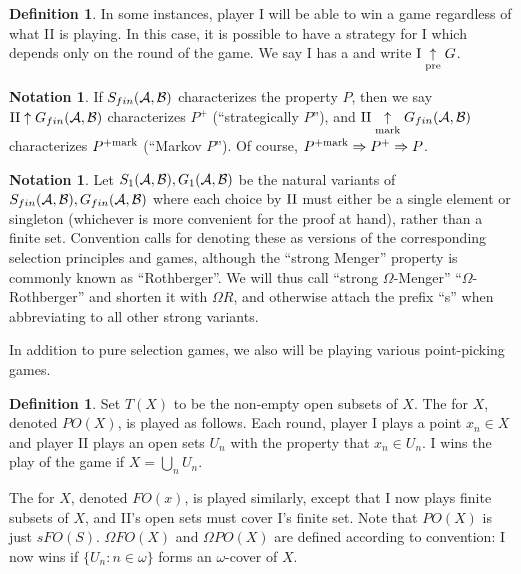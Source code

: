 \documentclass[11pt]{article}
\theoremstyle{plain}
\theoremstyle{definition}
\newtheorem{definition}[theorem]{Definition}
\newtheorem{notation}[theorem]{Notation}
\theoremstyle{remark}
\theoremstyle{plain}
\theoremstyle{definition}
\theoremstyle{remark}
\begin{document}
\begin{definition}
In some instances, player I will be able to win a game regardless of what II is playing.
In this case, it is possible to have a strategy for I which depends only on the round of the game.
We say I has a  and write \(\mathrm{I}\underset{\text{pre}}{\uparrow} G\).
\end{definition}

\begin{notation}
  If \(S_{fin}(\mathcal{A},\mathcal{B})\) characterizes the property \(P\),
  then we say \(\mathrm{II}\uparrow G_{fin}(\mathcal{A},\mathcal{B})\) characterizes
  \(P^+\) (``strategically \(P\)''), and
  \(\mathrm{II}\underset{\text{mark}}{\uparrow}G_{fin}(\mathcal{A},\mathcal{B})\) characterizes
  \(P^{+\mathrm{mark}}\) (``Markov \(P\)'').
  Of course, \(P^{+\mathrm{mark}}\Rightarrow P^+ \Rightarrow P\).
\end{notation}

\begin{notation}
Let \(S_{1}(\mathcal{A},\mathcal{B}),G_{1}(\mathcal{A},\mathcal{B})\)
be the natural variants of
\(S_{fin}(\mathcal{A},\mathcal{B}),G_{fin}(\mathcal{A},\mathcal{B})\) where each choice
by \(\mathrm{II}\) must either be a single element or singleton
(whichever is more convenient for the proof at hand), rather than a finite
set. Convention calls for denoting these as
 versions of the corresponding selection principles and games,
although the ``strong Menger'' property is commonly known as ``Rothberger''. We will thus
call ``strong \(\Omega\)-Menger'' ``\(\Omega\)-Rothberger'' and shorten it
with \(\Omega R\), and otherwise attach the prefix ``s''
when abbreviating to all other strong variants.
\end{notation}

In addition to pure selection games, we also will be playing various point-picking games.

\begin{definition}
Set \(T(X)\) to be the non-empty open subsets of \(X\).
The  for \(X\), denoted \(PO(X)\), is played as follows.
Each round, player I plays a point \(x_n \in X\) and player II plays an open sets \(U_n\) with the property that \(x_n \in U_n\).
I wins the play of the game if \(X = \bigcup_n U_n\).

The  for \(X\), denoted \(FO(x)\), is played similarly, except that I now plays finite subsets of \(X\), and II's open sets must cover I's finite set.
Note that \(PO(X)\) is just \(sFO(S)\).
\(\Omega FO(X)\) and \(\Omega PO(X)\) are defined according to convention: I now wins if \(\{U_n : n \in \omega\}\) forms an \(\omega\)-cover of \(X\).
\end{definition}
\end{document}
